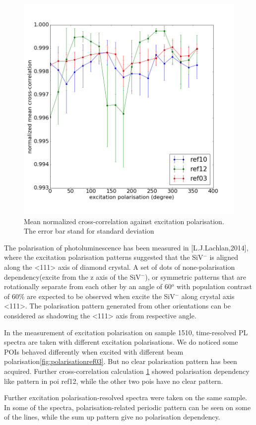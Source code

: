 \begin{figure}[h]
\centering
\includegraphics[width=0.7\linewidth]{"Figures/pic/excitation polarisation"}
\caption{Mean normalized cross-correlation against excitation polarisation. The error bar stand for standard deviation}
\label{fig:excitation-polarisation of untreated nanodiamond batch 2}
\end{figure}

The polarisation of photoluminescence has been measured in [L.J.Lachlan,2014], where the excitation polarisation patterns suggested that the SiV$^{-}$ is aligned along the <111> axis of diamond crystal. A set of dots of none-polarisation dependency(excite from the z axis of the SiV$^{-}$), or symmetric patterns that are rotationally separate from each other by an angle of 60$^{o}$ with population contrast of 60$\%$ are expected to be observed when excite the SiV$^{-}$ along crystal axis <111>. The polarisation pattern generated from other orientations can be considered as shadowing the <111> axis from respective angle.

In the measurement of excitation polarisation on sample 1510, time-resolved PL spectra are taken with different excitation polarisations. We do noticed some POIs behaved differently when excited with different beam polarisation\ref{fig:polarisationref03}. But no clear polarisation pattern has been acquired. Further cross-correlation calculation \ref{fig:excitation-polarisation of untreated nanodiamond batch 2} showed polarisation dependency like pattern in poi ref12, while the other two pois have no clear pattern.

Further excitation polarisation-resolved spectra were taken on the same sample. In some of the spectra, polarisation-related periodic pattern can be seen on some of the lines, while the sum up pattern give no polarisation dependency.


